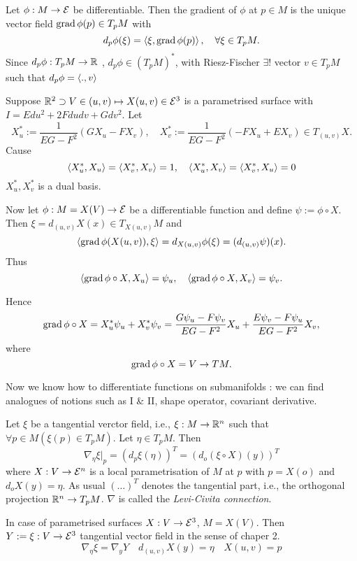 \begin{definition}
	Let $\phi: M \to \mathcal E$ be differentiable. Then the gradient of $\phi$ at $p \in M$ is the unique vector field $\operatorname{grad} \phi(p) \in T_pM$ with
		\[ d_p\phi(\xi) = \left \langle \xi, \operatorname{grad} \phi(p) \right\rangle, \quad \forall \xi \in T_pM. \]
	Since  $d_p\phi : T_pM \to \mathbb R $ , $d_p \phi \in (T_pM)^*$, with Riesz-Fischer $\exists!$ vector $v \in T_pM$ such that $d_p\phi= \left \langle .,v \right\rangle$
\end{definition}

\begin{example}
	Suppose $\mathbb R^2 \supset V \in (u,v) \mapsto X(u,v) \in \mathcal E^3$ is a parametrised surface with $I= Edu^2 + 2Fdudv + Gdv^2$. Let
		\[ X_u^*:= \frac 1{EG-F^2}(GX_u-FX_v), \quad
			X_v^*:= \frac 1{EG-F^2} (-FX_u +EX_v) \in T_{(u,v)}X. \]
	Cause
		\[ \left \langle X_u^*,X_u \right\rangle = \left \langle X_v^*,X_v \right\rangle=1, \quad
			\left \langle X_u^*,X_v \right\rangle = \left \langle X_v^*,X_u \right\rangle =0 \]
	$X_u^*,X_v^*$ is a dual basis. 
	
	Now let $\phi : M= X(V) \to \mathcal E$ be a differentiable function and define $\psi := \phi \circ X$. Then $\xi = d_{(u,v)} X(x)  \in T_{X(u,v)}M$ and
		\[ \left \langle \operatorname{grad} \phi(X(u,v)), \xi \right\rangle = d_{X(u,v)}\phi(\xi) = (d_{(u,v)}\psi)(x). \]
	Thus 
		\[\left \langle  \operatorname{grad} \phi \circ X, X_u \right\rangle = \psi_u, \quad \left \langle  \operatorname{grad} \phi \circ X, X_v \right\rangle = \psi_v.\]
		
	Hence 
		\[ \operatorname{grad} \phi \circ X = X_u^*\psi_u + X_v^*\psi_v
			= \frac {G\psi_u - F\psi_v}{EG-F^2}X_u + \frac {E\psi_v - F\psi_u}{EG-F^2}X_v, \]
	where
		\[ \operatorname{grad} \phi \circ X = V \to TM. \]
\end{example}
	

Now we know how to differentiate functions on submanifolds : we can find analogues of notions such as I \& II, shape operator, covariant derivative.

\begin{definition}
	Let $  \xi $ be a tangential verctor field, i.e., $ \xi : M \rightarrow \mathbb R^n $ such that $ \forall p \in M(\xi(p) \in T_pM) $. Let $ \eta \in T_pM $. Then 	
		\[ \nabla_\eta \xi \big|_p = (d_p\xi(\eta))^T = (d_o(\xi \circ X)(y))^T \]
	where $ X: V \rightarrow \mathcal E^n $ is a local parametrisation of $ M $ at $ p $ with $ p = X(o) $ and $ d_oX(y) = \eta $. As usual $ (\dots)^T $ denotes the tangential part, i.e., the orthogonal projection $ \mathbb R^n \rightarrow T_pM $. $ \nabla $ is called the \emph{Levi-Civita connection}.
\end{definition}

\begin{remark}
	In case of parametrised surfaces $ X: V \rightarrow \mathcal E^3 $, $ M = X(V) $. Then $ Y:= \xi : V \rightarrow \mathcal E^3 $ tangential vector field in the sense of chaper 2.
		\[ \nabla_\eta \xi = \nabla_yY \quad d_{(u,v)}X(y) = \eta \quad X(u,v) = p \] 
\end{remark}

